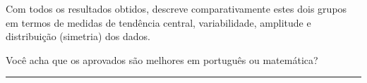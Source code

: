 \documentclass[a4paper,11pt,fleqn]{article}\usepackage[]{graphicx}\usepackage[]{color}
\theoremstyle{definition}
\begin{document}
\begin{compactenum}[4.]
\begin{compactenum}
\item Com todos os resultados obtidos, descreve comparativamente estes
    dois grupos em termos de medidas de tendência central,
    variabilidade, amplitude e distribuição (simetria) dos dados.
  \item Você acha que os aprovados são melhores em português ou
    matemática?
  \end{compactenum}
\end{compactenum}



\vspace{0.3cm}
\hrule
\vspace{0.3cm}
\end{document}
